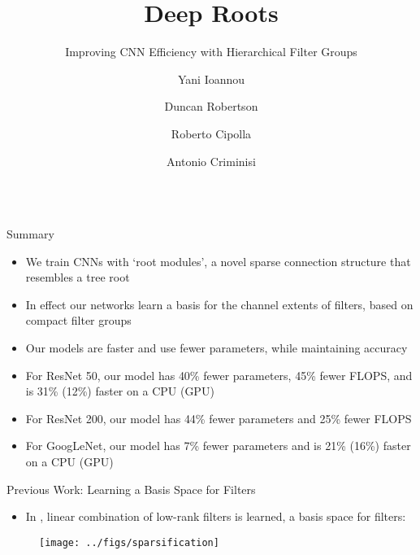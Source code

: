 \documentclass[final]{beamer}
\title %
{Deep Roots}
\subtitle{Improving CNN Efficiency with Hierarchical Filter Groups}
\author[Y. Ioannou, D. Robertson, R. Cipolla and A. Criminisi]
{Yani Ioannou\inst{1} \and Duncan Robertson\inst{2} \and Roberto Cipolla\inst{1} \and Antonio Criminisi\inst{2}}
\institute[University of Cambridge and Microsoft Research] %
{\inst{1} University of Cambridge, \inst{2} Microsoft Research, Cambridge}
\date
\begin{document}


\begin{frame}{}

\begin{columns}[t]

\begin{column}{0.32\paperwidth}

\begin{block}{Summary}
  \begin{itemize}
	\item We train CNNs with `root modules', a novel sparse connection structure that resembles a tree root
    \item In effect our networks learn a basis for the channel extents of filters, based on compact filter groups
	\item Our models are \alert{faster} and use \alert{fewer parameters}, while maintaining \alert{accuracy}
      \item For \alert{ResNet 50}, our model has \alert{40\%} fewer parameters, \alert{45\%} fewer FLOPS, and is 31\% (12\%) faster on a CPU (GPU)
      \item For \alert{ResNet 200}, our model has \alert{44\%} fewer parameters and \alert{25\%} fewer FLOPS
      \item For GoogLeNet, our model has 7\% fewer parameters and is 21\% (16\%) faster on a CPU (GPU)
  \end{itemize}
\end{block}

\begin{block}{Previous Work: Learning a Basis Space for Filters}{}
\begin{itemize}
   \item In \citep{Ioannou2016}, linear combination of low-rank filters is learned, \ie a basis space for filters:
\end{itemize}

\vspace{1em}

\begin{figure}
   \texttt{[image: ../figs/sparsification]}
\end{figure}


\end{block}
\end{column}
\end{columns}
\end{frame}
\end{document}

